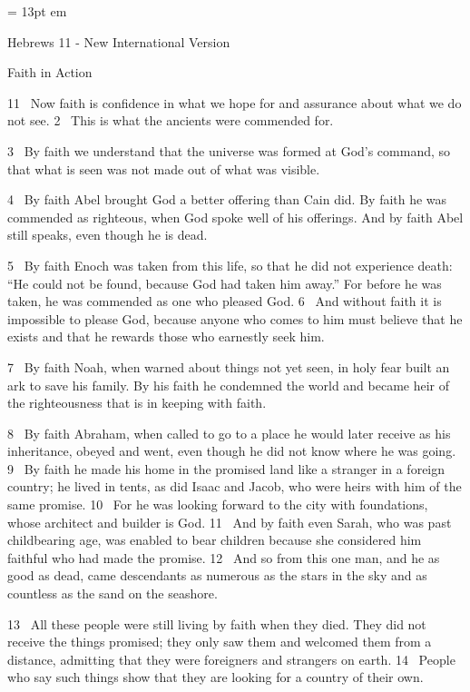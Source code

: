 
\FFrh \baselineskip = 13pt
 em


\centerline{  \FFbg
Hebrews 11 - New International Version }

\par
Faith in Action
\par
11 
Now faith is confidence in what we hope for
and assurance about what we do not see.
2 
This is what the ancients were commended for.
\par
3 
By faith we understand that the universe was formed at God’s command,
so that what is seen was not made out of what was visible.
\par
4 
By faith Abel brought God a better offering than Cain did. By faith he was commended
as righteous, when God spoke well of his offerings.
And by faith Abel still speaks, even though he is dead.
\par
5 
By faith Enoch was taken from this life, so that he did not experience death: “He could not be found, because God had taken him away.”
For before he was taken, he was commended as one who pleased God.
6 
And without faith it is impossible to please God, because anyone who comes to him
must believe that he exists and that he rewards those who earnestly seek him.
\par
7 
By faith Noah, when warned about things not yet seen,
in holy fear built an ark
to save his family.
By his faith he condemned the world and became heir of the righteousness that is in keeping with faith.
\par
8 
By faith Abraham, when called to go to a place he would later receive as his inheritance,
obeyed and went,
even though he did not know where he was going.
9 
By faith he made his home in the promised land
like a stranger in a foreign country; he lived in tents,
as did Isaac and Jacob, who were heirs with him of the same promise.
10 
For he was looking forward to the city
with foundations,
whose architect and builder is God.
11 
And by faith even Sarah, who was past childbearing age,
was enabled to bear children
because she
considered him faithful
who had made the promise.
12 
And so from this one man, and he as good as dead,
came descendants as numerous as the stars in the sky and as countless as the sand on the seashore.
\par
13 
All these people were still living by faith when they died. They did not receive the things promised;
they only saw them and welcomed them from a distance,
admitting that they were foreigners and strangers on earth.
14 
People who say such things show that they are looking for a country of their own.
